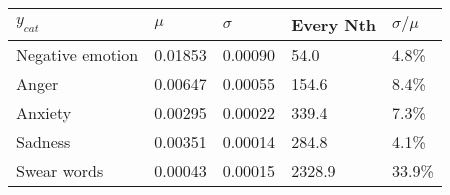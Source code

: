 \begin{tabular}{lllll}
\toprule
$y_{cat}$ &    $\mu$ & $\sigma$ & Every Nth & $\sigma / \mu$ \\
\midrule
Negative emotion &  0.01853 &  0.00090 &      54.0 &          4.8\% \\
Anger            &  0.00647 &  0.00055 &     154.6 &          8.4\% \\
Anxiety          &  0.00295 &  0.00022 &     339.4 &          7.3\% \\
Sadness          &  0.00351 &  0.00014 &     284.8 &          4.1\% \\
Swear words      &  0.00043 &  0.00015 &    2328.9 &         33.9\% \\
\bottomrule
\end{tabular}
